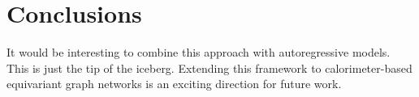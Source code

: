 \section{Conclusions}\label{sec:conclusions}

It would be interesting to combine this approach with autoregressive
models. This is just the tip of the iceberg. Extending this framework to
calorimeter-based equivariant graph networks is an exciting direction
for future work.

